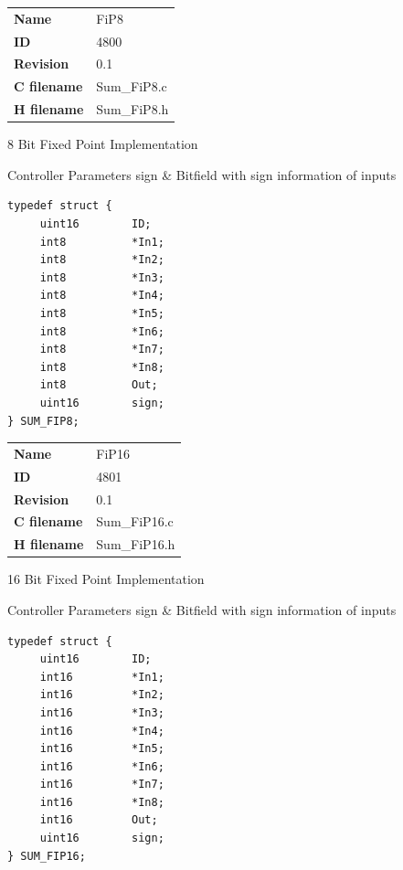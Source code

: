 \nopagebreak[0]
\begin{tabular}{l l}
\textbf{Name} & FiP8 \tabularnewline
\textbf{ID} & 4800 \tabularnewline
\textbf{Revision} & 0.1 \tabularnewline
\textbf{C filename} & Sum\_FiP8.c \tabularnewline
\textbf{H filename} & Sum\_FiP8.h \tabularnewline
\end{tabular}
\vspace{1ex}

8 Bit Fixed Point Implementation

\begin{XtoCtabular}{Controller Parameters}
sign & Bitfield with sign information of inputs\tabularnewline
\hline
\end{XtoCtabular}

\begin{lstlisting}
typedef struct {
     uint16        ID;
     int8          *In1;
     int8          *In2;
     int8          *In3;
     int8          *In4;
     int8          *In5;
     int8          *In6;
     int8          *In7;
     int8          *In8;
     int8          Out;
     uint16        sign;
} SUM_FIP8;
\end{lstlisting}

\ifdefined \AddTestReports
{}
\fi
{}
\nopagebreak[0]
\begin{tabular}{l l}
\textbf{Name} & FiP16 \tabularnewline
\textbf{ID} & 4801 \tabularnewline
\textbf{Revision} & 0.1 \tabularnewline
\textbf{C filename} & Sum\_FiP16.c \tabularnewline
\textbf{H filename} & Sum\_FiP16.h \tabularnewline
\end{tabular}
\vspace{1ex}

16 Bit Fixed Point Implementation

\begin{XtoCtabular}{Controller Parameters}
sign & Bitfield with sign information of inputs\tabularnewline
\hline
\end{XtoCtabular}

\begin{lstlisting}
typedef struct {
     uint16        ID;
     int16         *In1;
     int16         *In2;
     int16         *In3;
     int16         *In4;
     int16         *In5;
     int16         *In6;
     int16         *In7;
     int16         *In8;
     int16         Out;
     uint16        sign;
} SUM_FIP16;
\end{lstlisting}


